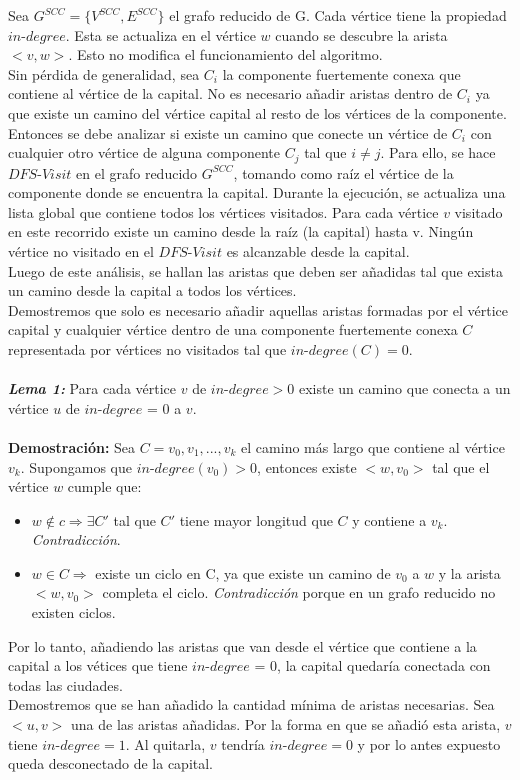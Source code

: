 \documentclass[a4paper,10pt]{article}
\begin{document}
	Sea $G^{SCC}=\{ V^{SCC},E^{SCC}\}$ el grafo reducido de G. Cada v\'ertice tiene la propiedad $in$-$degree$. Esta se actualiza en el v\'ertice $w$ cuando se descubre la arista $<v,w>$. Esto no modifica el funcionamiento del algoritmo.
	\\Sin p\'erdida de generalidad, sea $C_i$ la componente fuertemente conexa que contiene al v\'ertice de la capital. No es necesario añadir aristas dentro de $C_i$ ya que existe un camino del vértice capital al resto de los vértices de la componente. Entonces se debe analizar si existe un camino que conecte un v\'ertice de $C_i$ con cualquier otro v\'ertice de alguna componente $C_j$ tal que $i \neq j$. Para ello, se hace $DFS$-$Visit$ en el grafo reducido $G^{SCC}$, tomando como ra\'iz el v\'ertice de la componente donde se encuentra la capital. Durante la ejecución, se actualiza una lista global que contiene todos los v\'ertices visitados. Para cada vértice $v$ visitado en este recorrido existe un camino desde la raíz (la capital) hasta v. Ningún v\'ertice no visitado en el $DFS$-$Visit$ es alcanzable desde la capital.	  
	\\ Luego de este análisis, se hallan las aristas que deben ser a\~nadidas tal que exista un camino desde la capital a todos los vértices.
	\\Demostremos que solo es necesario a\~nadir aquellas aristas formadas por el v\'ertice capital y cualquier v\'ertice dentro de una componente fuertemente conexa $C$ representada por v\'ertices no visitados tal que $in$-$degree(C) = 0$.
	\\\\\emph{\textbf{Lema 1:}} Para cada v\'ertice $v$ de $in$-$degree > 0$ existe un camino que conecta a un v\'ertice $u$ de $in$-$degree$ = 0 a $v$.
	\\\\\textbf{Demostraci\'on:} Sea $C = v_0, v_1, ..., v_k$ el camino m\'as largo que contiene al v\'ertice $v_k$. Supongamos que $in$-$degree(v_0) > 0$, entonces existe $<w, v_0>$ tal que el v\'ertice $w$ cumple que:
	\begin{itemize}
		\item $w \notin c \Rightarrow \exists C'$ tal que $C'$ tiene mayor longitud que $C$ y contiene a $v_k$. \emph{Contradicci\'on}.
		\item $w \in C \Rightarrow$ existe un ciclo en C, ya que existe un camino de $v_0$ a $w$ y la arista $<w,v_0>$ completa el ciclo. \emph{Contradicci\'on} porque en un grafo reducido no existen ciclos.
	\end{itemize}
	Por lo tanto, a\~nadiendo las aristas que van desde el v\'ertice que contiene a la capital a los v\'etices que tiene $in$-$degree$ = 0, la capital quedar\'ia conectada con todas las ciudades. 
	\\Demostremos que se han a\~nadido la cantidad m\'inima de aristas necesarias. Sea $<u,v>$ una de las aristas a\~nadidas. Por la forma en que se añadió esta arista, $v$ tiene $in$-$degree = 1$. Al quitarla, $v$ tendr\'ia $in$-$degree = 0$ y por lo antes expuesto queda desconectado de la capital.  
\end{document}
